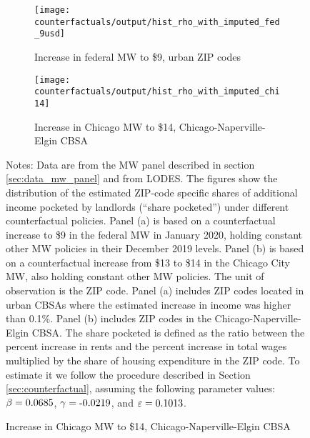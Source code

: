 \begin{figure}[h!]
    \centering
    \caption{Estimated shares pocketed by landlords under counterfactual MW policies}
    \label{fig:cf_hist_shares}

    \begin{subfigure}{0.65\textwidth}
        \caption{Increase in federal MW to \$9, urban ZIP codes}
        \texttt{[image: counterfactuals/output/hist\_rho\_with\_imputed\_fed\_9usd]}
    \end{subfigure}

    \begin{subfigure}{0.65\textwidth}
        \caption{Increase in Chicago MW to \$14, Chicago-Naperville-Elgin CBSA}
        \texttt{[image: counterfactuals/output/hist\_rho\_with\_imputed\_chi14]}
    \end{subfigure}

    \begin{minipage}{.95\textwidth} \footnotesize
        \vspace{3mm}
        Notes:
        Data are from the MW panel described in section \ref{sec:data_mw_panel} 
        and from LODES.
        The figures show the distribution of the estimated ZIP-code specific
        shares of additional income pocketed by landlords (``share pocketed'')
        under different counterfactual policies.
        Panel (a) is based on a counterfactual increase to \$9 in the 
        federal MW in January 2020, holding constant other MW policies in their 
        December 2019 levels.
        Panel (b) is based on a counterfactual increase from \$13 to \$14 in the 
        Chicago City MW, also holding constant other MW policies.
        The unit of observation is the ZIP code.
        Panel (a) includes ZIP codes located in urban CBSAs where the estimated 
        increase in income was higher than 0.1\%.
        Panel (b) includes ZIP codes in the Chicago-Naperville-Elgin CBSA.
        The share pocketed is defined as the ratio between the percent increase 
        in rents and the percent increase in total wages multiplied by the share 
        of housing expenditure in the ZIP code.
        To estimate it we follow the procedure described in Section 
        \ref{sec:counterfactual}, assuming the following parameter values: 
        $\beta = \textnormal{0.0685}$, $\gamma = \textnormal{-0.0219}$, and $\varepsilon = \textnormal{0.1013}$.
    \end{minipage}
\end{figure}
